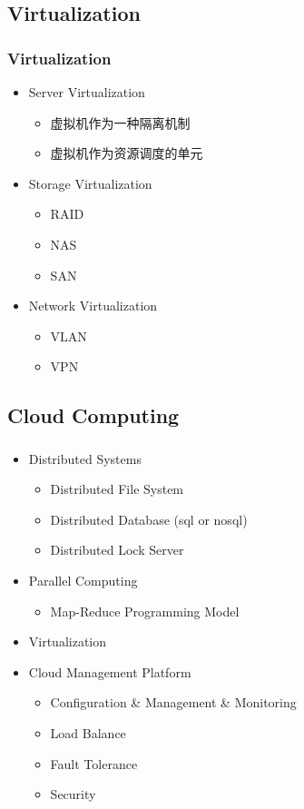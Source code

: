 \subsection{Virtualization}
\begin{frame}
  \frametitle{Virtualization}
  \begin{itemize}
    \item Server Virtualization
      \begin{itemize}
        \item 虚拟机作为一种隔离机制
        \item 虚拟机作为资源调度的单元
      \end{itemize}
    \item Storage Virtualization
      \begin{itemize}
        \item RAID
        \item NAS
        \item SAN
      \end{itemize}
    \item Network Virtualization
      \begin{itemize}
        \item VLAN
        \item VPN
      \end{itemize}
  \end{itemize}
\end{frame}

\subsection{Cloud Computing}
\begin{frame}
  \frametitle{\subsecname}
  \begin{itemize}
    \item Distributed Systems 
      \begin{itemize}
        \item Distributed File System
        \item Distributed Database (sql or nosql)
        \item Distributed Lock Server
      \end{itemize}
    \item Parallel Computing
      \begin{itemize}
        \item Map-Reduce Programming Model
      \end{itemize}
    \item Virtualization
    \item Cloud Management Platform
      \begin{itemize}
        \item Configuration \& Management \& Monitoring
        \item Load Balance
        \item Fault Tolerance
        \item Security
      \end{itemize}
  \end{itemize}
\end{frame}


